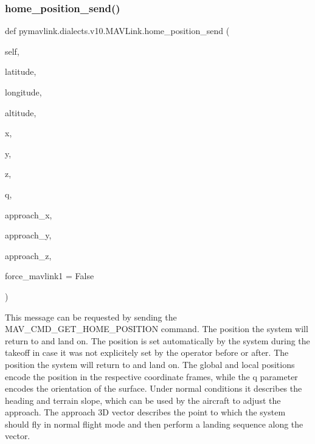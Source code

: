 \begin{DoxyVerb}
\begin{DoxyVerb}
\begin{DoxyVerb}
\begin{DoxyVerb}
 \mbox{\label{classpymavlink_1_1dialects_1_1v10_1_1MAVLink_aeb75c2ce72cdbef5899ab52051a323d2}} 
\subsubsection{\texorpdfstring{home\+\_\+position\+\_\+send()}{home\_position\_send()}}
{\footnotesize\ttfamily def pymavlink.\+dialects.\+v10.\+M\+A\+V\+Link.\+home\+\_\+position\+\_\+send (\begin{DoxyParamCaption}\item[{}]{self,  }\item[{}]{latitude,  }\item[{}]{longitude,  }\item[{}]{altitude,  }\item[{}]{x,  }\item[{}]{y,  }\item[{}]{z,  }\item[{}]{q,  }\item[{}]{approach\+\_\+x,  }\item[{}]{approach\+\_\+y,  }\item[{}]{approach\+\_\+z,  }\item[{}]{force\+\_\+mavlink1 = {\ttfamily False} }\end{DoxyParamCaption})}

\begin{DoxyVerb}This message can be requested by sending the MAV_CMD_GET_HOME_POSITION
command. The position the system will return to and
land on. The position is set automatically by the
system during the takeoff in case it was not
explicitely set by the operator before or after. The
position the system will return to and land on. The
global and local positions encode the position in the
respective coordinate frames, while the q parameter
encodes the orientation of the surface. Under normal
conditions it describes the heading and terrain slope,
which can be used by the aircraft to adjust the
approach. The approach 3D vector describes the point
to which the system should fly in normal flight mode
and then perform a landing sequence along the vector.


\end{DoxyVerb}
\end{DoxyVerb}
\end{DoxyVerb}
\end{DoxyVerb}
\end{DoxyVerb}
